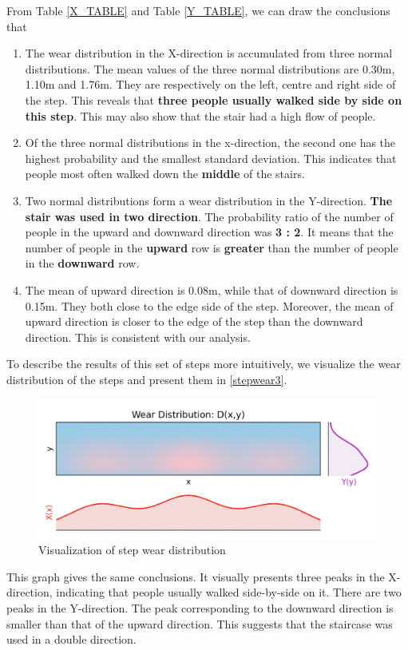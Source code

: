 \documentclass[12pt]{article}  %
\numberwithin{equation}{section} %
\begin{document}
From  Table \ref{X_TABLE} and Table \ref{Y_TABLE}, we can draw the conclusions that
\begin{enumerate}[\bfseries 1.]
	\setlength{\parsep}{0ex} %
	\setlength{\topsep}{-1ex} %
	\setlength{\itemsep}{0ex} %
	\item The wear distribution in the X-direction is accumulated from three normal distributions. The mean values of the three normal distributions are 0.30m, 1.10m and 1.76m. They are respectively on the left, centre and right side of the step. This reveals that \textbf{three people usually walked side by side on this step}. This may also show that the stair had a high flow of people.
	\item Of the three normal distributions in the x-direction, the second one has the highest probability and the smallest standard deviation. This indicates that people most often walked down the \textbf{middle} of the stairs. 
	\item Two normal distributions form a wear distribution in the Y-direction. \textbf{The stair was used in two direction}. The probability ratio of the number of people in the upward and downward direction was \textbf{3 : 2}. 
 It means that the number of people in the \textbf{upward} row is \textbf{greater} than the number of people in the \textbf{downward} row.
     \item The mean of upward direction is 0.08m, while that of downward direction is 0.15m. They both close to the edge side of the step. Moreover, the mean of upward direction is closer to the edge of the step than the downward direction. This is consistent with our analysis.
\end{enumerate}
\vspace{-1em}

To describe the results of this set of steps more intuitively, we visualize the wear distribution of the steps and present them in \autoref{stepwear3}.
\begin{figure}[H]
\vspace{-1em}
	\centering
\includegraphics[width=0.8\linewidth]{美赛Latex模板/stepwear3.png}
	\caption{Visualization of step wear distribution}
	\label{stepwear3}
 \vspace{-1em}
\end{figure}
This graph gives the same conclusions. It visually presents three peaks in the X-direction, indicating that people usually walked side-by-side on it. There are two peaks in the Y-direction. The peak corresponding to the downward direction is smaller than that of the upward direction. This suggests that the staircase was used in a double direction.
\end{document}
